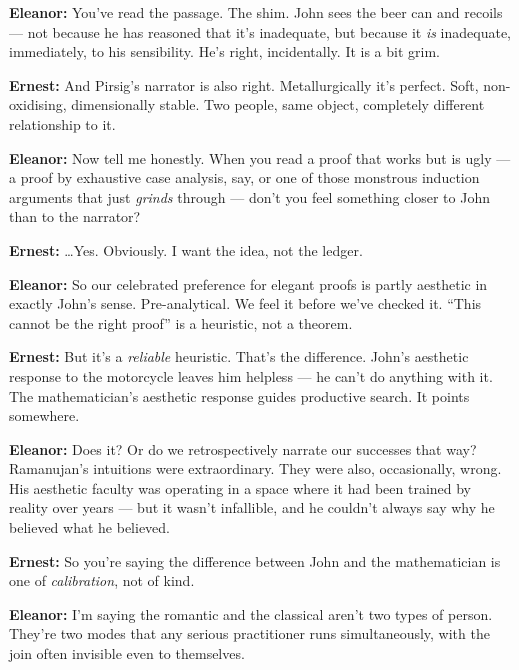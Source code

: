 \noindent\textbf{Eleanor:} You've read the passage. The shim. John sees the beer can and recoils --- not
because he has reasoned that it's inadequate, but because it \textit{is} inadequate, immediately,
to his sensibility. He's right, incidentally. It is a bit grim.
 
\noindent\textbf{Ernest:} And Pirsig's narrator is also right. Metallurgically it's perfect. Soft, non-oxidising,
dimensionally stable. Two people, same object, completely different relationship to it.
 
\noindent\textbf{Eleanor:} Now tell me honestly. When you read a proof that works but is ugly --- a proof by
exhaustive case analysis, say, or one of those monstrous induction arguments that
just \textit{grinds} through --- don't you feel something closer to John than to the narrator?
 
\noindent\textbf{Ernest:} \ldots{}Yes. Obviously. I want the idea, not the ledger.
 
\noindent\textbf{Eleanor:} So our celebrated preference for elegant proofs is partly aesthetic in exactly John's
sense. Pre-analytical. We feel it before we've checked it. ``This cannot be the right
proof'' is a heuristic, not a theorem.
 
\noindent\textbf{Ernest:} But it's a \textit{reliable} heuristic. That's the difference. John's aesthetic response
to the motorcycle leaves him helpless --- he can't do anything with it. The
mathematician's aesthetic response guides productive search. It points somewhere.
 
\noindent\textbf{Eleanor:} Does it? Or do we retrospectively narrate our successes that way? Ramanujan's
intuitions were extraordinary. They were also, occasionally, wrong. His aesthetic
faculty was operating in a space where it had been trained by reality over years ---
but it wasn't infallible, and he couldn't always say why he believed what he believed.
 
\noindent\textbf{Ernest:} So you're saying the difference between John and the mathematician is one of
\textit{calibration}, not of kind.
 
\noindent\textbf{Eleanor:} I'm saying the romantic and the classical aren't two types of person. They're
two modes that any serious practitioner runs simultaneously, with the join often invisible
even to themselves.
 
\vspace{1.5em}
 
